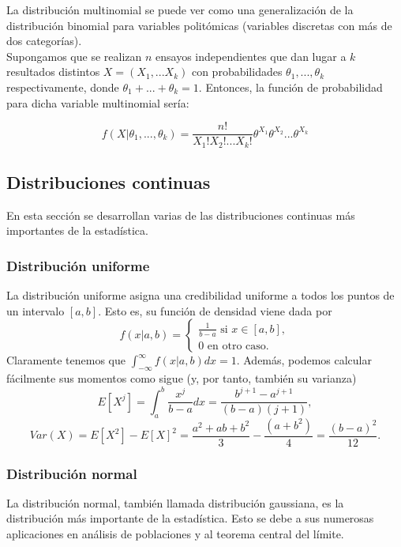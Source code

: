 \documentclass{article}
\begin{document}
\begin{definition}
	La distribución multinomial se puede ver como una generalización de la distribución binomial para variables politómicas (variables discretas con más de dos categorías).
	\\Supongamos que se realizan $n$ ensayos independientes que dan lugar a $k$ resultados distintos $X = (X_1, ... X_k)$  con probabilidades $\theta_1, ... , \theta_k$ respectivamente, donde $\theta_1+... + \theta_k = 1$. Entonces, la función de probabilidad para dicha variable multinomial sería:

	\[
	f(X|\theta_1, ... , \theta_k) = \frac{n!}{X_1! X_2! ... X_k!} \theta^{X_1} \theta^{X_2} ... \theta^{X_k}
	\]

\end{definition}


\subsection{Distribuciones continuas}

En esta sección se desarrollan varias de las distribuciones continuas más importantes de la estadística.

\subsubsection{Distribución uniforme}

La distribución uniforme asigna una credibilidad uniforme a todos los puntos de un intervalo $[a,b]$. Esto es, su función de densidad viene dada por
\[f(x|a,b) = \begin{cases}\frac{1}{b-a} \text{ si } x \in [a,b], \\ 0 \text{ en otro caso.}\end{cases}\]
Claramente tenemos que $\int_{-\infty}^{\infty} f(x |a,b) dx = 1$. Además, podemos calcular fácilmente sus momentos como sigue (y, por tanto, también su varianza)
\[E[X^j] = \int_a^b \frac{x^j}{b-a} dx = \frac{b^{j+1} - a^{j+1}}{(b-a) (j+1)},\]
\[Var(X) = E[X^2] - E[X]^2 = \frac{a^2 + ab + b^2}{3} - \frac{(a+b^2)}{4} = \frac{(b-a)^2}{12}.\]

\subsubsection{Distribución normal}

La distribución normal, también llamada distribución gaussiana, es la distribución más importante de la estadística. Esto se debe a sus numerosas aplicaciones en análisis de poblaciones y al teorema central del límite.
\end{document}
